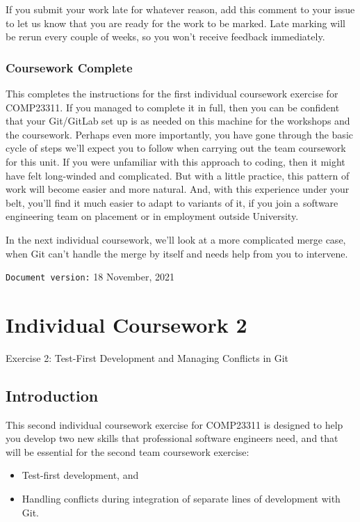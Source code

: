\documentclass[
]{book}
\providecommand{\tightlist}{%
  \setlength{\itemsep}{0pt}\setlength{\parskip}{0pt}}
\begin{document}
If you submit your work late for whatever reason, add this comment to your issue to let us know that you are ready for the work to be marked. Late marking will be rerun every couple of weeks, so you won't receive feedback immediately.

\hypertarget{gameover}{%
\subsection{Coursework Complete}\label{gameover}}

This completes the instructions for the first individual coursework exercise for COMP23311. If you managed to complete it in full, then you can be confident that your Git/GitLab set up is as needed on this machine for the workshops and the coursework. Perhaps even more importantly, you have gone through the basic cycle of steps we'll expect you to follow when carrying out the team coursework for this unit. If you were unfamiliar with this approach to coding, then it might have felt long-winded and complicated. But with a little practice, this pattern of work will become easier and more natural. And, with this experience under your belt, you'll find it much easier to adapt to variants of it, if you join a software engineering team on placement or in employment outside University.

In the next individual coursework, we'll look at a more complicated merge case, when Git can't handle the merge by itself and needs help from you to intervene.

\texttt{Document\ version:} 18 November, 2021

\hypertarget{conflicting}{%
\chapter{Individual Coursework 2}\label{conflicting}}

Exercise 2: Test-First Development and Managing Conflicts in Git

\hypertarget{introt}{%
\section{Introduction}\label{introt}}

This second individual coursework exercise for COMP23311 is designed to help you develop two new skills that professional software engineers need, and that will be essential for the second team coursework exercise:

\begin{itemize}
\tightlist
\item
  Test-first development, and
\item
  Handling conflicts during integration of separate lines of development with Git.
\end{itemize}
\end{document}
